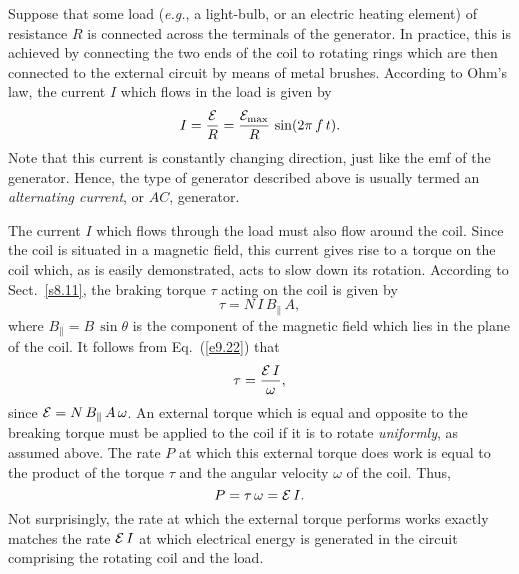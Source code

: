 Suppose that some load ({\em e.g.}, a light-bulb, or an electric heating
element) of resistance $R$ is connected across the terminals of the
generator. In practice, this is achieved by connecting the two ends of the
 coil to rotating rings which are then connected to the external circuit by means
of metal brushes. According to Ohm's law, the current $I$ which flows in the
load is given by
\begin{equation}\label{e9.25}
I = \frac{\cal E}{R} = \frac{ {\cal E}_{\rm max}}{R}\, \sin (2\pi\, f\, t).
\end{equation}
Note that this current is constantly changing direction, just like the
emf of the generator. Hence, the type of generator described above is
usually termed an {\em alternating current}, or $AC$, generator. 

The current $I$ which flows through the load must also flow around the coil.
Since the coil is situated in a magnetic field, this current gives rise to
a torque on the coil which, as is easily demonstrated, acts to slow down its
rotation. According to  Sect.~\ref{s8.11}, the braking torque $\tau$ acting
on the coil is given by
\begin{equation}
\tau = N\,I\,B_\parallel\,A,
\end{equation}
where $B_\parallel=B\,\sin\theta$ is the component of the magnetic field which
lies in the plane of the coil. It follows from Eq.~(\ref{e9.22}) that 
\begin{equation}\label{e9.27}
\tau = \frac{{\cal E}\, I}{\omega},
\end{equation}
since ${\cal E} = N\,B_\parallel\,A\,\omega$. 
An external
torque which is equal and opposite to the breaking torque must be applied to
the coil if it is to rotate {\em uniformly}, as assumed
above. The rate $P$ at which this external torque does work is equal to the
product of the torque $\tau$ and the angular velocity $\omega$ of the coil. Thus,
\begin{equation}
P= \tau\,\omega = {\cal E}\, I.
\end{equation}
Not surprisingly, the rate at which the external torque performs works exactly matches the
rate ${\cal E}\,I$ at which electrical energy is generated in the circuit comprising the rotating coil and the load.

